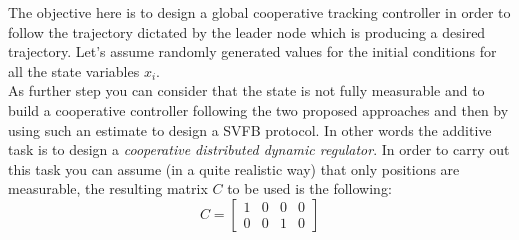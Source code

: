 The objective here is to design a global cooperative tracking controller in order to follow the trajectory dictated by the leader node which is producing a desired trajectory. Let's assume randomly generated values for the initial conditions for all the state variables $x_i$.\\
As further step you can consider that the state is not fully measurable and to build a cooperative controller following the two proposed approaches  and then by using such an estimate to design a SVFB protocol. In other words the additive task is to design a \textit{cooperative distributed dynamic regulator}. In order to carry out this task you can assume (in a quite realistic way) that only positions are measurable, the resulting matrix $C$ to be used is the following: 
\begin{equation*}
    C = \begin{bmatrix}
        1&0&0&0\\
        0&0&1&0
    \end{bmatrix}
\end{equation*}





